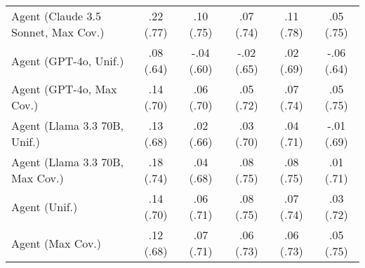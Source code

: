 \begin{table}[h!]
\begin{tabular}{lccccc}
    Agent (Claude 3.5 Sonnet, Max Cov.) & \cellcolor{gold!30}.22 {\small (.77)} & \cellcolor{bronze!30}.10 {\small (.75)} & .07 {\small (.74)} & \cellcolor{gold!30}.11 {\small (.78)} & .05 {\small (.75)} \\
    Agent (GPT-4o, Unif.) & .08 {\small (.64)} & -.04 {\small (.60)} & -.02 {\small (.65)} & .02 {\small (.69)} & -.06 {\small (.64)} \\
    Agent (GPT-4o, Max Cov.) & .14 {\small (.70)} & .06 {\small (.70)} & .05 {\small (.72)} & .07 {\small (.74)} & .05 {\small (.75)} \\
    Agent (Llama 3.3 70B, Unif.) & .13 {\small (.68)} & .02 {\small (.66)} & .03 {\small (.70)} & .04 {\small (.71)} & -.01 {\small (.69)} \\
    Agent (Llama 3.3 70B, Max Cov.) & .18 {\small (.74)} & .04 {\small (.68)} & .08 {\small (.75)} & .08 {\small (.75)} & .01 {\small (.71)} \\
    Agent (Unif.) & .14 {\small (.70)} & .06 {\small (.71)} & .08 {\small (.75)} & .07 {\small (.74)} & .03 {\small (.72)} \\
    Agent (Max Cov.) & .12 {\small (.68)} & .07 {\small (.71)} & .06 {\small (.73)} & .06 {\small (.73)} & .05 {\small (.75)} \\
    \bottomrule
    \end{tabular}
\end{table}